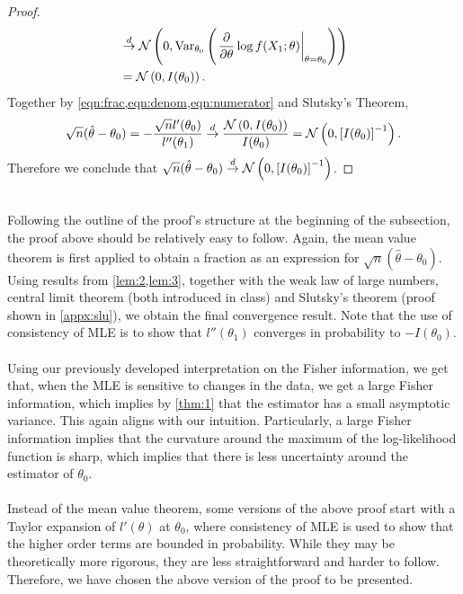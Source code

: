 \begin{proof}
\begin{align}
&\overset{d}{\rightarrow} \mathcal{N}\left(0, \text{Var}_{\theta_0}\left( \left.\frac{\partial}{\partial\theta}\log f(X_1;\theta)\right\vert_{\theta=\theta_0} \right)\right)\nonumber\\
&= \mathcal{N}\left( 0, I(\theta_0) \right). \label{eqn:numerator}
\end{align}
Together by \cref{eqn:frac,eqn:denom,eqn:numerator} and Slutsky's Theorem,
\begin{align*}
\sqrt{n}(\hat{\theta} - \theta_0) = -\frac{\sqrt{n}l'(\theta_0)}{l''(\theta_1)} \overset{d}{\rightarrow} \frac{\mathcal{N}\left(0,I(\theta_0)\right)}{I(\theta_0)} = \mathcal{N}\left(0, \left[ I(\theta_0) \right]^{-1}\right).
\end{align*}
Therefore we conclude that $\sqrt{n}(\hat{\theta} - \theta_0)\overset{d}{\rightarrow}\mathcal{N}\left(0, \left[ I(\theta_0) \right]^{-1}\right)$.
\end{proof}$ $\\
Following the outline of the proof's structure at the beginning of the subsection, the proof above should be relatively easy to follow. Again, the mean value theorem is first applied to obtain a fraction as an expression for $\sqrt{n}(\hat{\theta} - \theta_0)$. Using results from \cref{lem:2,lem:3}, together with the weak law of large numbers, central limit theorem (both introduced in class) and Slutsky's theorem (proof shown in \cref{appx:slu}), we obtain the final convergence result. Note that the use of consistency of MLE is to show that $l''(\theta_1)$ converges in probability to $-I(\theta_0)$.\\\\
Using our previously developed interpretation on the Fisher information, we get that, when the MLE is sensitive to changes in the data, we get a large Fisher information, which implies by \cref{thm:1} that the estimator has a small asymptotic variance. This again aligns with our intuition. Particularly, a large Fisher information implies that the curvature around the maximum of the log-likelihood function is sharp, which implies that there is less uncertainty around the estimator of $\theta_0$.\\\\
Instead of the mean value theorem, some versions of the above proof start with a Taylor expansion of $l'(\theta)$ at $\theta_0$, where consistency of MLE is used to show that the higher order terms are bounded in probability. While they may be theoretically more rigorous, they are less straightforward and harder to follow. Therefore, we have chosen the above version of the proof to be presented.\\\\
